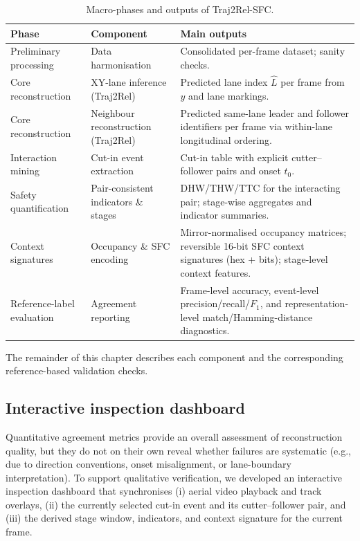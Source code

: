 \documentclass[12pt,a4paper,twoside,openright]{report}
\newcommand{\FrameworkName}{Traj2Rel-SFC}
\begin{document}
    \begin{table}[H]
        \centering
        \caption{Macro-phases and outputs of \FrameworkName{}.}
        \label{tab:framework-phases}
        {\small
        \setlength{\tabcolsep}{4pt}
            \begin{tabularx}{\textwidth}{@{}l l >{\raggedright\arraybackslash}X@{}}
\toprule
Phase & Component & Main outputs \\
\midrule
Preliminary processing & Data harmonisation & Consolidated per-frame dataset; sanity checks. \\
\midrule
Core reconstruction & XY-lane inference (Traj2Rel) & Predicted lane index $\hat{L}$ per frame from $y$ and lane markings. \\
Core reconstruction & Neighbour reconstruction (Traj2Rel) & Predicted same-lane leader and follower identifiers per frame via within-lane longitudinal ordering. \\
\midrule
Interaction mining & Cut-in event extraction & Cut-in table with explicit cutter--follower pairs and onset $t_0$. \\
Safety quantification & Pair-consistent indicators \& stages & DHW/THW/TTC for the interacting pair; stage-wise aggregates and indicator summaries. \\
\midrule
Context signatures & Occupancy \& SFC encoding & Mirror-normalised occupancy matrices; reversible 16-bit SFC context signatures (hex + bits); stage-level context features. \\
\midrule
Reference-label evaluation & Agreement reporting & Frame-level accuracy, event-level precision/recall/$F_1$, and representation-level match/Hamming-distance diagnostics. \\
\bottomrule
            \end{tabularx}}
    \end{table}

    The remainder of this chapter describes each component and the corresponding reference-based validation checks.


    \subsection{Interactive inspection dashboard}
    Quantitative agreement metrics provide an overall assessment of reconstruction quality, but they do not on their own reveal whether failures are systematic (e.g., due to direction conventions, onset misalignment, or lane-boundary interpretation). To support qualitative verification, we developed an interactive inspection dashboard that synchronises (i) aerial video playback and track overlays, (ii) the currently selected cut-in event and its cutter--follower pair, and (iii) the derived stage window, indicators, and context signature for the current frame.
\end{document}
